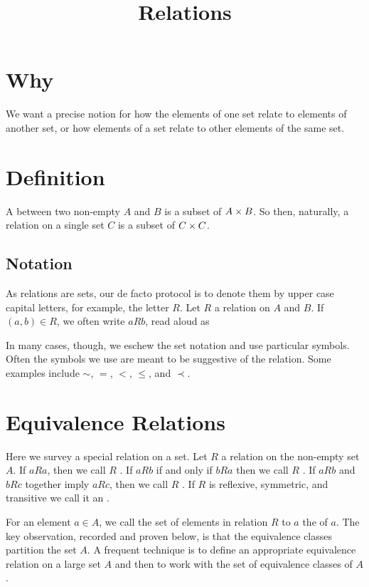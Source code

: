 







\title{Relations}

\section{Why}
We want a precise notion for how the elements of one set relate to elements of another set, or how elements of a set relate to other elements of the same set.

\section{Definition}

A  between two non-empty  $A$ and $B$ is a subset of $A \times B$.
So then, naturally, a relation on a single set $C$ is a subset of $C \times C$.

\subsection{Notation}
As relations are sets, our de facto protocol is to denote them by upper case capital letters, for example, the letter $R$.
Let $R$ a relation on $A$ and $B$.
If $(a, b) \in R$, we often write $a R b$, read aloud as 

In many cases, though, we eschew the set notation and use particular symbols.
Often the symbols we use are meant to be suggestive of the relation.
Some examples include $\sim$, $=$, $<$, $\leq$, and $\prec$.

\section{Equivalence Relations}

Here we survey a special relation on a set.
Let $R$ a relation on the non-empty set $A$.
If $aRa$, then we call $R$ .
If $aRb$ if and only if $bRa$ then we call $R$ .
If $aRb$ and $bRc$ together imply $aRc$, then we call $R$ .
If $R$ is reflexive, symmetric, and transitive we call it an .

For an element $a \in A$, we call the set of elements in relation $R$ to $a$ the  of $a$.
The key observation, recorded and proven below, is that the equivalence classes partition the set $A$.
A frequent technique is to define an appropriate equivalence relation on a large set $A$ and then to work with the set of equivalence classes of $A$.

